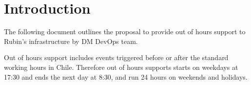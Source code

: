 \section{Introduction}

The following document outlines the proposal to provide out of hours support to Rubin's infrastructure by DM DevOps team. 

Out of hours support includes events triggered before or after the standard working hours in Chile. Therefore out of hours supports starts on weekdays at 17:30 and ends the next day at 8:30, and run 24 hours on weekends and holidays.